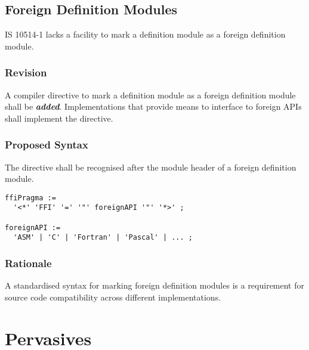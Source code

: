 \documentclass[10pt,a4paper,leqno,fleqn]{article}
\renewcommand{\emph}[1]{\textbf{\textit{#1}}}
\begin{document}
\subsection{Foreign Definition Modules}

IS 10514-1 lacks a facility to mark a definition module as a
\gls{foreign definition module}.

\subsubsection{Revision}

A \gls{compiler directive} to mark a definition module
as a \gls{foreign definition module} shall be \emph{added}.
Implementations that provide means to interface to
\glspl{foreign API} shall implement the directive.

\subsubsection{Proposed Syntax}

The directive shall be recognised after the module header of a
foreign definition module.

\begin{verbatim}
ffiPragma :=
  '<*' 'FFI' '=' '"' foreignAPI '"' '*>' ;
  
foreignAPI :=
  'ASM' | 'C' | 'Fortran' | 'Pascal' | ... ;
\end{verbatim}

\subsubsection{Rationale}

A standardised syntax for marking \glspl{foreign definition module}
is a requirement for source code compatibility across different
implementations.


\section{Pervasives}

\end{document}
